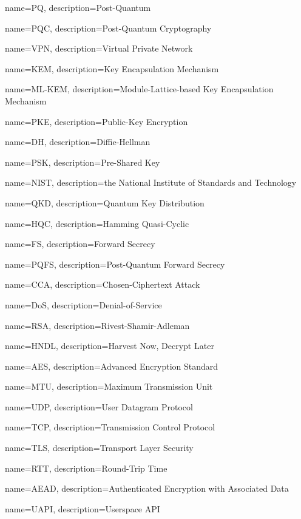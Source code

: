 {
    name=PQ,
    description={Post-Quantum}
}

{
    name=PQC,
    description={Post-Quantum Cryptography}
}

{
    name=VPN,
    description={Virtual Private Network}
}

{
    name=KEM,
    description={Key Encapsulation Mechanism}
}

{
    name=ML-KEM,
    description={Module-Lattice-based Key Encapsulation Mechanism}
}

{
    name=PKE,
    description={Public-Key Encryption}
}

{
    name=DH,
    description={Diffie-Hellman}
}

{
    name=PSK,
    description={Pre-Shared Key}
}

{
    name=NIST,
    description={the National Institute of Standards and Technology}
}

{
    name=QKD,
    description={Quantum Key Distribution}
}

{
    name=HQC,
    description={Hamming Quasi-Cyclic}
}

{
    name=FS,
    description={Forward Secrecy}
}

{
    name=PQFS,
    description={Post-Quantum Forward Secrecy}
}

{
    name=CCA,
    description={Chosen-Ciphertext Attack}
}

{
    name=DoS,
    description={Denial-of-Service}
}

{
    name=RSA,
    description={Rivest-Shamir-Adleman}
}

{
    name=HNDL,
    description={Harvest Now, Decrypt Later}
}

{
    name=AES,
    description={Advanced Encryption Standard}
}

{
    name=MTU,
    description={Maximum Transmission Unit}
}

{
    name=UDP,
    description={User Datagram Protocol}
}

{
    name=TCP,
    description={Transmission Control Protocol}
}

{
    name=TLS,
    description={Transport Layer Security}
}

{
    name=RTT,
    description={Round-Trip Time}
}

{
    name=AEAD,
    description={Authenticated Encryption with Associated Data}
}

{
    name=UAPI,
    description={Userspace API}
}



